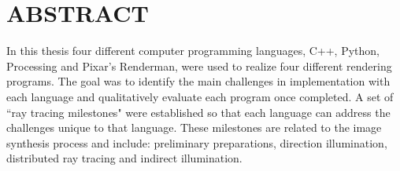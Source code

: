 %
%
%

\chapter*{ABSTRACT}

\pagestyle{plain} %
\setcounter{page}{2}

\indent In this thesis four different computer programming languages, C++, Python, Processing and Pixar's Renderman, were used to realize four different rendering programs.  The goal was to identify the main challenges in implementation with each language and qualitatively evaluate each program once completed.  A set of ``ray tracing milestones" were established so that each language can address the challenges unique to that language.  These milestones are related to the image synthesis process and include: preliminary preparations, direction illumination, distributed ray tracing and indirect illumination.  



\pagebreak{} 